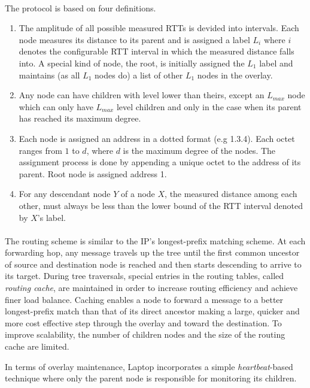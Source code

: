 \documentclass[a4paper,10pt]{article}
\begin{document}
\paragraph{}
The protocol is based on four definitions.
\begin{enumerate}
 \item The amplitude of all possible measured RTTs is devided into intervals. Each node measures its distance to its parent and is assigned a label $L_i$ where $i$ denotes the configurable RTT interval in which the measured distance falls into. A special kind of node, the root, is initially assigned the $L_1$ label and maintains (as all $L_1$ nodes do) a list of other $L_1$ nodes in the overlay.
 \item Any node can have children with level lower than theirs, except an $L_{max}$ node which can only have $L_{max}$ level children and only in the case when its parent has reached its maximum degree.
 \item Each node is assigned an address in a dotted format (e.g 1.3.4). Each octet ranges from $1$ to $d$, where $d$ is the maximum degree of the nodes. The assignment process is done by appending a unique octet to the address of its parent. Root node is assigned address 1.
 \item For any descendant node $Y$ of a node $X$, the measured distance among each other, must always be less than the lower bound of the RTT interval denoted by $X$'s label.
\end{enumerate}

\paragraph{}
The routing scheme is similar to the IP's longest-prefix matching scheme. At each forwarding hop, any message travels up the tree until the first common uncestor of source and destination node is reached and then starts descending to arrive to its target. During tree traversals, special entries in the routing tables, called \emph{routing cache}, are maintained in order to increase routing efficiency and achieve finer load balance. Caching enables a node to forward a message to a better longest-prefix match than that of its direct ancestor making a large, quicker and more cost effective step through the overlay and toward the destination. To improve scalability, the number of children nodes and the size of the routing cache are limited.

In terms of overlay maintenance, Laptop incorporates a simple \emph{heartbeat}-based technique where only the parent node is responsible for monitoring its children.
\end{document}
